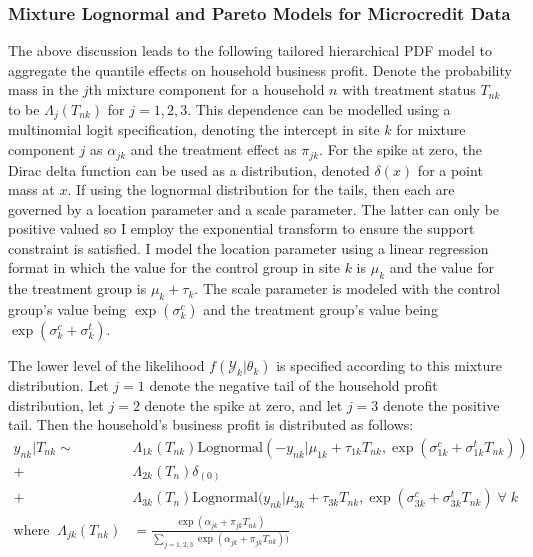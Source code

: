 \documentclass[AER]{AEA}
\begin{document}
\subsubsection{Mixture Lognormal and Pareto Models for Microcredit Data}
The above discussion leads to the following tailored hierarchical PDF model to aggregate the quantile effects on household business profit. Denote the probability mass in the $j$th mixture component for a household $n$ with treatment status $T_{nk}$ to be $\Lambda_j (T_{nk})$ for $j = 1,2,3$. This dependence can be modelled using a multinomial logit specification, denoting the intercept in site $k$ for mixture component $j$ as $\alpha_{jk}$ and the treatment effect as $\pi_{jk}$.  For the spike at zero, the Dirac delta function can be used as a distribution, denoted $\delta(x)$ for a point mass at $x$. If using the lognormal distribution for the tails, then each are governed by a location parameter and a scale parameter. The latter can only be positive valued so I employ the exponential transform to ensure the support constraint is satisfied. I model the location parameter using a linear regression format in which the value for the control group in site $k$ is $\mu_k$ and the value for the treatment group is $\mu_k + \tau_k$. The scale parameter is modeled with the control group's value being $\exp(\sigma^{c}_k)$ and the treatment group's value being $\exp(\sigma^{c}_k + \sigma^{t}_k)$.

The lower level of the likelihood $f(\mathcal{Y}_k | \theta_k)$ is specified according to this mixture distribution. Let $j=1$ denote the negative tail of the household profit distribution, let $j=2$ denote the spike at zero, and let $j=3$ denote the positive tail. Then the household's business profit is distributed as follows:
\begin{equation}
\begin{aligned}
y_{nk} | T_{nk}\sim \;&\Lambda_{1k}(T_{nk}) \text{Lognormal}(-y_{nk}| \mu_{1k} + \tau_{1k}T_{nk} ,  \exp(\sigma^{c}_{1k} + \sigma^{t}_{1k} T_{nk}))\\
+ &\Lambda_{2k}(T_n) \delta_{(0)} \\
+ &\Lambda_{3k}(T_n)   \text{Lognormal}(y_{nk}|\mu_{3k} + \tau_{3k}T_{nk} ,  \exp(\sigma^{c}_{3k} + \sigma^{t}_{3k} T_{nk}) \; \forall \; k \\
\text{where}\;\; \Lambda_{jk}(T_{nk}) &= \frac{\exp(\alpha_{jk} + \pi_ {jk} T_{nk})}{\sum_{j = 1,2,3}  \exp(\alpha_{jk} + \pi_{jk} T_{nk}))}
\end{aligned} \end{equation}
\end{document}
